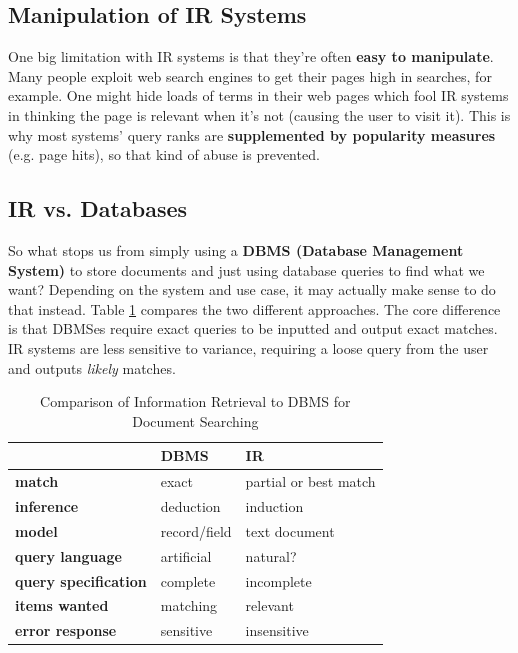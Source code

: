 \documentclass{article}
\begin{document}
\subsection{Manipulation of IR Systems}

One big limitation with IR systems is that they're often \textbf{easy to manipulate}. Many people exploit web search engines to get their pages high in searches, for example. One might hide loads of terms in their web pages which fool IR systems in thinking the page is relevant when it's not (causing the user to visit it). This is why most systems' query ranks are \textbf{supplemented by popularity measures} (e.g. page hits), so that kind of abuse is prevented.

\subsection{IR vs. Databases}

So what stops us from simply using a \textbf{DBMS (Database Management System)} to store documents and just using database queries to find what we want? Depending on the system and use case, it may actually make sense to do that instead. Table \ref{tab:ir-db-comparison} compares the two different approaches. The core difference is that DBMSes require exact queries to be inputted and output exact matches. IR systems are less sensitive to variance, requiring a loose query from the user and outputs \textit{likely} matches.
 
\begin{table}
	\centering
	\begin{tabular}{|l|l|l|}
		\hline
		& \textbf{DBMS} & \textbf{IR} \\
		\hline
		\textbf{match} & exact & partial or best match \\
		\textbf{inference} & deduction & induction \\
		\textbf{model} & record/field & text document \\
		\textbf{query language} & artificial & natural? \\
		\textbf{query specification} & complete & incomplete \\
		\textbf{items wanted} & matching & relevant \\
		\textbf{error response} & sensitive & insensitive \\
		\hline
	\end{tabular}
	\caption{Comparison of Information Retrieval to DBMS for Document Searching}
	\label{tab:ir-db-comparison}
\end{table}
\end{document}
